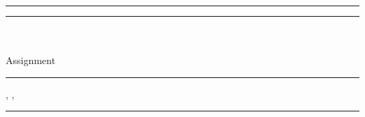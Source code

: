 \documentclass[a4paper,%
11pt,%
DIV=14,
headsepline,%
headings=normal,
]{scrartcl}
\begin{document}
\hrule

\hrule
\vspace*{2ex}
\begin{center}
{\LARGE\textbf{\fach}}\\
{\large{}%
  \semester \\
  Assignment \excNmbr\\
}
\end{center}
\hrule
\vspace*{1ex}

\noindent
\nname, \vname, \mtrnmbr
\vspace*{1ex}
\hrule

\setlength{\parindent}{0cm}


\end{document}
